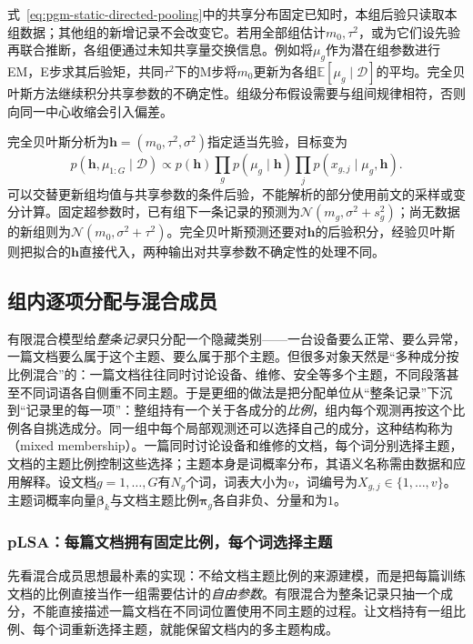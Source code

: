 式~\eqref{eq:pgm-static-directed-pooling}中的共享分布固定已知时，本组后验只读取本组数据；其他组的新增记录不会改变它。若用全部组估计$m_0,\tau^2$，或为它们设先验再联合推断，各组便通过未知共享量交换信息。例如将$\mu_g$作为潜在组参数进行EM，E步求其后验矩，共同$\tau^2$下的M步将$m_0$更新为各组$\mathbb E[\mu_g\mid\mathcal D]$的平均。完全贝叶斯方法继续积分共享参数的不确定性。组级分布假设需要与组间规律相符，否则向同一中心收缩会引入偏差。

完全贝叶斯分析为$\bm h=(m_0,\tau^2,\sigma^2)$指定适当先验，目标变为
\[
 p(\bm h,\mu_{1:G}\mid\mathcal D)
 \propto p(\bm h)\prod_g p(\mu_g\mid\bm h)
                         \prod_jp(x_{g,j}\mid\mu_g,\bm h).
\]
可以交替更新组均值与共享参数的条件后验，不能解析的部分使用前文的采样或变分计算。固定超参数时，已有组下一条记录的预测为$\mathcal N(m_g,\sigma^2+s_g^2)$；尚无数据的新组则为$\mathcal N(m_0,\sigma^2+\tau^2)$。完全贝叶斯预测还要对$\bm h$的后验积分，经验贝叶斯则把拟合的$\bm h$直接代入，两种输出对共享参数不确定性的处理不同。

\subsection{组内逐项分配与混合成员}
\label{sec:pgm-static-directed-mixed-membership}

有限混合模型给\emph{整条记录}只分配一个隐藏类别——一台设备要么正常、要么异常，一篇文档要么属于这个主题、要么属于那个主题。但很多对象天然是“多种成分按比例混合”的：一篇文档往往同时讨论设备、维修、安全等多个主题，不同段落甚至不同词语各自侧重不同主题。于是更细的做法是把分配单位从“整条记录”下沉到“记录里的每一项”：整组持有一个关于各成分的\emph{比例}，组内每个观测再按这个比例各自挑选成分。同一组中每个局部观测还可以选择自己的成分，这种结构称为（mixed membership）。一篇同时讨论设备和维修的文档，每个词分别选择主题，文档的主题比例控制这些选择；主题本身是词概率分布，其语义名称需由数据和应用解释。设文档$g=1,\ldots,G$有$N_g$个词，词表大小为$v$，词编号为$X_{g,j}\in\{1,\ldots,v\}$。主题词概率向量$\bm\beta_k$与文档主题比例$\bm\pi_g$各自非负、分量和为$1$。

\subsubsection{pLSA：每篇文档拥有固定比例，每个词选择主题}
\label{sec:pgm-static-directed-plsa-model}

先看混合成员思想最朴素的实现：不给文档主题比例的来源建模，而是把每篇训练文档的比例直接当作一组需要估计的\emph{自由参数}。有限混合为整条记录只抽一个成分，不能直接描述一篇文档在不同词位置使用不同主题的过程。让文档持有一组比例、每个词重新选择主题，就能保留文档内的多主题构成。

